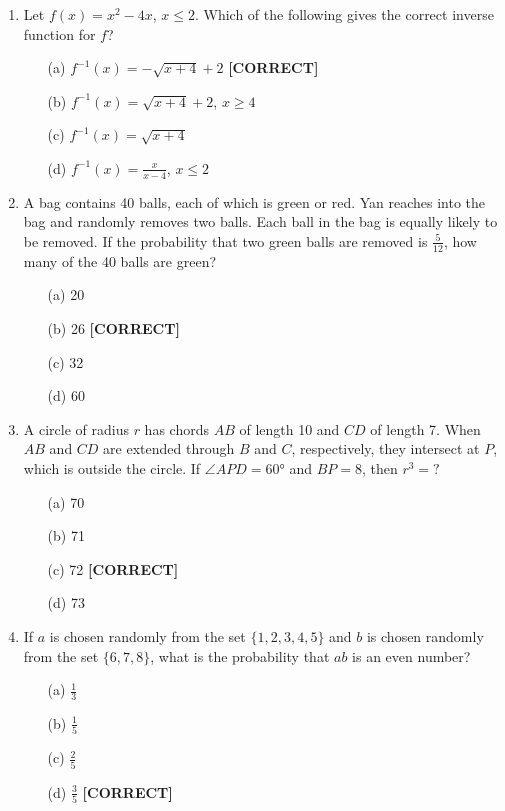 \documentclass[12pt]{article}
\begin{document}
\begin{enumerate}
\item Let $f(x) = x^2 - 4x$, $x \leq 2$. Which of the following gives the correct inverse function for $f$?
\begin{enumerate}
    \item[(a)] $f^{-1}(x) = -\sqrt{x+4} + 2$ \quad \textbf{[CORRECT]}
    \item[(b)] $f^{-1}(x) = \sqrt{x+4} + 2$, $x \geq 4$
    \item[(c)] $f^{-1}(x) = \sqrt{x+4}$
    \item[(d)] $f^{-1}(x) = \frac{x}{x-4}$, $x \leq 2$
\end{enumerate}

\item A bag contains 40 balls, each of which is green or red. Yan reaches into the bag and randomly removes two balls. Each ball in the bag is equally likely to be removed. If the probability that two green balls are removed is $\frac{5}{12}$, how many of the 40 balls are green?
\begin{enumerate}
    \item[(a)] 20
    \item[(b)] 26 \quad \textbf{[CORRECT]}
    \item[(c)] 32
    \item[(d)] 60
\end{enumerate}

\item A circle of radius $r$ has chords $AB$ of length 10 and $CD$ of length 7. When $AB$ and $CD$ are extended through $B$ and $C$, respectively, they intersect at $P$, which is outside the circle. If $\angle APD = 60°$ and $BP = 8$, then $r^3 = ?$
\begin{enumerate}
    \item[(a)] 70
    \item[(b)] 71
    \item[(c)] 72 \quad \textbf{[CORRECT]}
    \item[(d)] 73
\end{enumerate}

\item If $a$ is chosen randomly from the set $\{1, 2, 3, 4, 5\}$ and $b$ is chosen randomly from the set $\{6, 7, 8\}$, what is the probability that $ab$ is an even number?
\begin{enumerate}
    \item[(a)] $\frac{1}{3}$
    \item[(b)] $\frac{1}{5}$
    \item[(c)] $\frac{2}{5}$
    \item[(d)] $\frac{3}{5}$ \quad \textbf{[CORRECT]}
\end{enumerate}


\end{enumerate}
\end{document}
